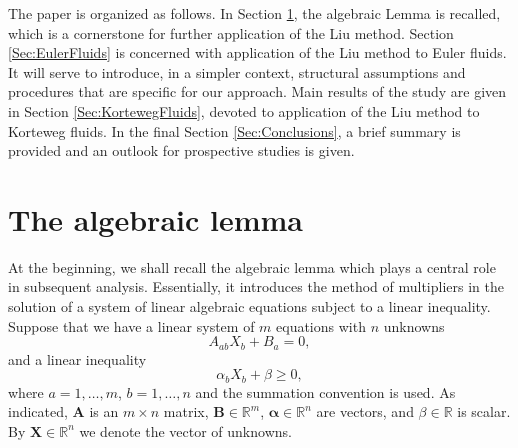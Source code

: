 \documentclass[a4paper,fleqn]{cas-sc}
\theoremstyle{definition}
\begin{document}
The paper is organized as follows. In Section \ref{Sec:Lemma}, the algebraic Lemma is recalled, which is a cornerstone for further application of the Liu method. Section \ref{Sec:EulerFluids} is concerned with application of the Liu method to Euler fluids. It will serve to introduce, in a simpler context, structural assumptions and procedures that are specific for our approach. Main results of the study are given in Section \ref{Sec:KortewegFluids}, devoted to application of the Liu method to Korteweg fluids. In the final Section \ref{Sec:Conclusions}, a brief summary is provided and an outlook for prospective studies is given. 


\section{The algebraic lemma} \label{Sec:Lemma}

At the beginning, we shall recall the algebraic lemma which plays a central role in subsequent analysis. Essentially, it introduces the method of multipliers in the solution of a system of linear algebraic equations subject to a linear inequality. Suppose that we have a linear system of $m$ equations with $n$ unknowns
\begin{equation}
	\label{sistem jednacina}
	A_{ab}X_b+B_a=0,
\end{equation}
and a linear inequality
\begin{equation} \label{nejednakost}
	\alpha_bX_b+\beta\geq 0,
\end{equation}
where $a=1,\ldots,m$, $b=1,\ldots,n$ and the summation convention is used. As indicated, $\mathbf{A}$ is an $m\times n$ matrix, $\mathbf{B}\in\mathbb{R}^m$, $\boldsymbol\alpha\in\mathbb{R}^n$ are vectors, and $\beta \in \mathbb{R}$ is scalar. By $\mathbf{X} \in \mathbb{R}^{n}$ we denote the vector of unknowns. 
\end{document}
